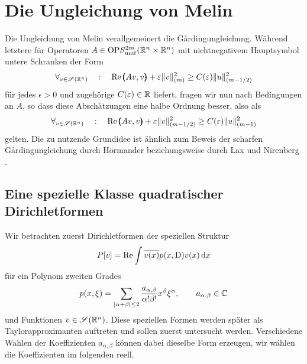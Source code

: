 \chapter{Die Ungleichung von Melin}

Die Ungleichung von Melin verallgemeinert die G\r{a}rdingungleichung. Während letztere für Operatoren $A\in\mathrm{OP}S^{2m}_{\rm unif}(\mathbb R^n\times\mathbb R^n)$ mit nichtnegativem Hauptsymbol untere Schranken der Form 
\begin{equation}
\forall_{v\in\mathscr S(\mathbb R^n)}\quad:\quad  \operatorname{Re}\pmb(Av,v\pmb) + \varepsilon \|v\|^2_{(m)} \ge C(\varepsilon) \|u\|_{(m-1/2)}^2
\end{equation}
für jedes $\epsilon>0$ und zugehörige $C(\varepsilon)\in\mathbb R$ liefert, fragen wir nun nach Bedingungen an $A$, so dass diese Abschätzungen eine halbe Ordnung besser, also als
\begin{equation}
  \forall_{v\in\mathscr S(\mathbb R^n)}\quad:\quad   \operatorname{Re}\pmb(Av,v\pmb) + \varepsilon \|v\|^2_{(m-1/2)} \ge C(\varepsilon) \|u\|_{(m-1)}^2
\end{equation}
gelten. Die zu nutzende Grundidee ist ähnlich zum Beweis der scharfen G\r{a}rdingungleichung durch Hörmander \cite{Hormander:1966} beziehungsweise durch Lax und Nirenberg
\cite{Lax:1966}.

\section{Eine spezielle Klasse quadratischer Dirichletformen}
Wir betrachten zuerst Dirichletformen der speziellen Struktur
\begin{equation}
   P[v] = \operatorname{Re}  \int \overline{v(x)}p(x,\mathrm D)v(x)\,\mathrm d x 
\end{equation}
für ein Polynom zweiten Grades
\begin{equation}
    p(x,\xi) = \sum_{|\alpha+\beta|\le 2} \frac{ a_{\alpha,\beta}}{\alpha!\beta!} x^\beta \xi^\alpha,\qquad a_{\alpha,\beta}\in\mathbb C
\end{equation}
und Funktionen $v\in\mathscr S(\mathbb R^n)$. Diese speziellen Formen werden später als Taylorapproximanten auftreten und sollen zuerst untersucht werden. Verschiedene Wahlen der Koeffizienten $a_{\alpha,\beta}$ können dabei dieselbe Form erzeugen, wir wählen die Koeffizienten im folgenden reell.

